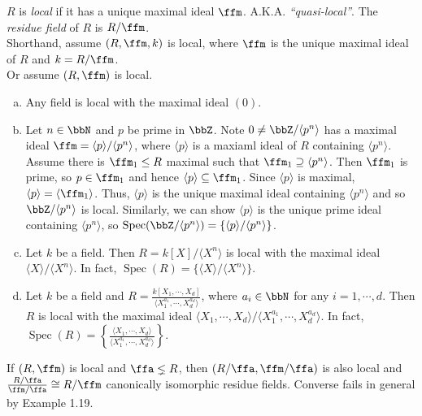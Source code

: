 \begin{definition}
    $R$ is \emph{local} if it has a unique maximal ideal $\ffm$. A.K.A. \emph{``quasi-local''}. The \emph{residue field} of $R$ is $R/\ffm$. \\
    Shorthand, assume $(R,\ffm,k)$ is local, where $\ffm$ is the unique maximal ideal of $R$ and $k = R/\ffm$. \\
    Or assume $(R,\ffm)$ is local.
\end{definition}

\begin{example}
    \begin{enumerate}[(a)]
        \item Any field is local with the maximal ideal $(0)$.
        \item Let $n \in \bbN$ and $p$ be prime in $\bbZ$. Note $0 \neq \bbZ/\langle p^n \rangle$ has a maximal ideal $\ffm = \langle p \rangle/\langle p^n \rangle$, where $\langle p \rangle$ is a maxiaml ideal of $R$ containing $\langle p^n \rangle$. Assume there is $\ffm_1 \leq R$ maximal such that $\ffm_1 \supseteq \langle p^n \rangle$. Then $\ffm_1$ is prime, so $p \in \ffm_1$ and hence $\langle p \rangle \subseteq \ffm_1$. Since $\langle p \rangle$ is maximal, $\langle p \rangle = \langle \ffm_1 \rangle$. Thus, $\langle p \rangle$ is the unique maximal ideal containing $\langle p^n \rangle$ and so $\bbZ/\langle p^n \rangle$ is local. Similarly, we can show $\langle p \rangle$ is the unique prime ideal containing $\langle p^n \rangle$, so $\operatorname{Spec}(\bbZ/\langle p^n \rangle) = \left\{\langle p \rangle/\langle p^n \rangle\right\}$. 
        \item Let $k$ be a field. Then $R = k[X]/\langle X^n \rangle$ is local with the maximal ideal $\langle X \rangle / \langle X^n \rangle$. In fact, $\operatorname{Spec}(R) = \{\langle X \rangle/\langle X^n \rangle\}$.
        \item Let $k$ be a field and $R = \frac{k[X_1,\cdots,X_d]}{\langle X_1^{a_1}, \cdots, X_d^{a_d}\rangle}$, where $a_i \in \bbN$ for any $i = 1,\cdots,d$. Then $R$ is local with the maximal ideal $\langle X_1,\cdots,X_d\rangle/\langle X_1^{a_1},\cdots,X_d^{a_d} \rangle$. In fact, $\operatorname{Spec}(R) = \left\{\frac{\langle X_1,\cdots,X_d\rangle}{\langle X_1^{a_1}, \cdots, X_d^{a_d}\rangle}\right\}$.
    \end{enumerate}
\end{example}

\begin{fact}
    If $(R,\ffm)$ is local and $\ffa \lneq R$, then $(R/\ffa,\ffm/\ffa)$ is also local and $\frac{R/\ffa}{\ffm/\ffa} \cong R/\ffm$ canonically isomorphic residue fields. Converse fails in general by Example 1.19. 
\end{fact}

